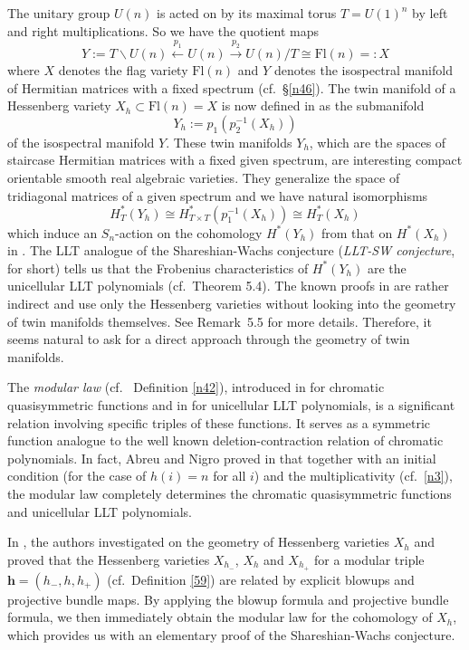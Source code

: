 \documentclass[11pt]{article}
\theoremstyle{definition}
\numberwithin{equation}{section}
\numberwithin{equation}{section}
\newcommand\beq{\begin{equation}}
\newcommand\eeq{\end{equation}}
\newcommand\Fl{\mathrm{Fl}}
\newcommand\bh{\mathbf{h}}
\begin{document}
The unitary group $U(n)$ is acted on by its maximal torus $T=U(1)^n$ by left and right multiplications. So we have the quotient maps 
$$Y:= T\backslash U(n) \xleftarrow{p_1}U(n)\xrightarrow{p_2}U(n)/T\cong \Fl(n)=:X$$
where $X$ denotes the flag variety $\Fl(n)$ and $Y$ denotes the isospectral manifold of Hermitian matrices with a fixed spectrum (cf.~\S\ref{n46}).  
The twin manifold of a Hessenberg variety $X_h\subset \Fl(n)=X$ is now defined in \cite{AB} as the submanifold $$Y_h:=p_1(p_2^{-1}(X_h))$$ of the isospectral manifold $Y$. 
These twin manifolds $Y_h$, which are the spaces of staircase Hermitian matrices with a fixed given spectrum, are interesting compact orientable smooth real algebraic varieties.
They generalize the space of tridiagonal matrices of a given spectrum \cite{Tom,BFR,DJ} and 
we have natural isomorphisms 
\beq\label{n47}
H^*_T(Y_h)\cong H^*_{T\times T}( p_1^{-1}(X_h))\cong H^*_T(X_h)\eeq 
which induce an $S_n$-action on the cohomology $H^*(Y_h)$ from that on $H^*(X_h)$ in \cite{Tym}.
The LLT analogue of the Shareshian-Wachs conjecture (\emph{LLT-SW conjecture}, for short) tells us that the Frobenius characteristics of $H^*(Y_h)$ are the unicellular LLT polynomials (cf.~Theorem 5.4). 
The known proofs in \cite{MS,PS} are rather indirect and use only  the Hessenberg varieties without looking into the geometry of twin manifolds themselves.
See Remark~5.5 for more details. 
Therefore, it seems natural to ask for a direct approach through the geometry of twin manifolds.  
 
The \emph{modular law} (cf.~ Definition \ref{n42}), introduced in \cite{AN, GP} for chromatic quasisymmetric functions and in \cite{Ale, Lee} for unicellular LLT polynomials, is a significant relation involving specific triples of these functions. It serves as a symmetric function analogue to the well known deletion-contraction relation of chromatic polynomials.
In fact, Abreu and Nigro proved in \cite{AN} that together with an initial condition (for the case of $h(i)=n$ for all $i$) and the multiplicativity (cf.~\eqref{n3}), 
the modular law completely determines the chromatic quasisymmetric functions and unicellular LLT polynomials. 

In \cite{KL}, the authors investigated on the geometry of Hessenberg varieties $X_h$ and proved that 
the Hessenberg varieties $X_{h_-}$, $X_{h}$ and $X_{h_+}$ for a modular triple $\bh=(h_-,h,h_+)$ (cf.~Definition \ref{59}) are related by explicit blowups and projective bundle maps. 
By applying the blowup formula and projective bundle formula, we then immediately obtain
the modular law for the cohomology of $X_h$, which provides us with an elementary proof of the Shareshian-Wachs conjecture. 
\end{document}
